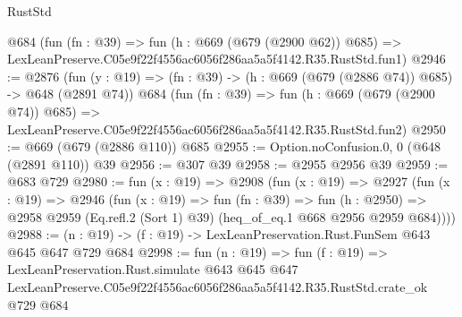 \begin{lexlean}{RustStd}
\begin{coremodule}
    @684
    (fun (fn : @39) =>
    fun (h : @669 (@679 (@2900 @62)) @685) =>
    LexLeanPreserve.C05e9f22f4556ac6056f286aa5a5f4142.R35.RustStd.fun1)
@2946 := @2876
    (fun (y : @19) => (fn : @39) -> (h : @669 (@679 (@2886 @74)) @685) -> @648 (@2891 @74))
    @684
    (fun (fn : @39) =>
    fun (h : @669 (@679 (@2900 @74)) @685) =>
    LexLeanPreserve.C05e9f22f4556ac6056f286aa5a5f4142.R35.RustStd.fun2)
@2950 := @669 (@679 (@2886 @110)) @685
@2955 := Option.noConfusion.{0, 0} (@648 (@2891 @110)) @39
@2956 := @307 @39
@2958 := @2955 @2956 @39
@2959 := @683 @729
@2980 := fun (x : @19) =>
  @2908
    (fun (x : @19) =>
    @2927
      (fun (x : @19) =>
      @2946
        (fun (x : @19) =>
        fun (fn : @39) =>
        fun (h : @2950) =>
        @2958 @2959 (Eq.refl.{2} (Sort 1) @39) (heq_of_eq.{1} @668 @2956 @2959 @684))))
@2988 := (n : @19) -> (f : @19) -> LexLeanPreservation.Rust.FunSem @643 @645 @647 @729 @684
@2998 := fun (n : @19) =>
  fun (f : @19) =>
  LexLeanPreservation.Rust.simulate
    @643
    @645
    @647
    LexLeanPreserve.C05e9f22f4556ac6056f286aa5a5f4142.R35.RustStd.crate_ok
    @729
    @684
\end{coremodule}
\end{lexlean}
